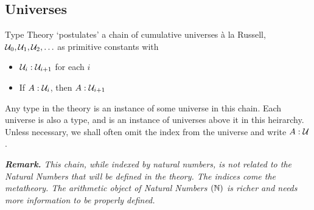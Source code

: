 \subsection{Universes}

Type Theory `postulates' a chain of cumulative universes à la Russell,
  $\mathcal{U}_0, \mathcal{U}_1, \mathcal{U}_2, \ldots$ as primitive constants
with
\begin{itemize}
  \item $\mathcal{U}_i : \mathcal{U}_{i+1}$ for each $i$ 
  \item If $A : \mathcal{U}_i$, then $A : \mathcal{U}_{i+1}$ 
\end{itemize}
Any type in the theory is an instance of some universe in this chain. Each universe is also a type,
and is an instance of universes above it in this heirarchy. Unless necessary, we shall often omit the index from
the universe and write $A : \mathcal{U}$.

\textit{\textbf{Remark.} This chain, while indexed by natural numbers, is not related to the Natural 
Numbers that will be defined in the theory. The indices come the metatheory.
The arithmetic object of Natural Numbers $(\mathbb{N})$ is richer and needs more
information to be properly defined.}
